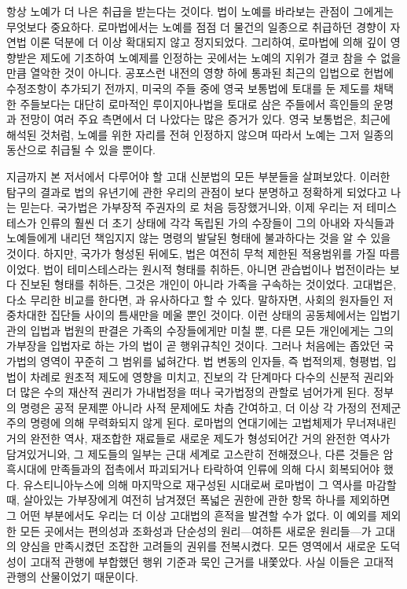 항상 노예가 더 나은 취급을 받는다는 것이다.
법이 노예를 바라보는 관점이 그에게는 무엇보다 중요하다.
로마법에서는
노예를 점점 더 물건의 일종으로 취급하던 경향이
자연법 이론 덕분에
더 이상 확대되지 않고 정지되었다.
그리하여,
로마법에 의해 깊이 영향받은 제도에 기초하여 노예제를 인정하는 곳에서는
노예의 지위가 결코 참을 수 없을 만큼 열악한 것이 아니다.
공포스런 내전의 영향 하에 통과된 최근의 입법으로
헌법에 수정조항이 추가되기 전까지,
미국의 주들 중에
영국 보통법에 토대를 둔 제도를 채택한 주들보다는
대단히 로마적인 루이지아나법을 토대로 삼은 주들에서
흑인들의 운명과 전망이 여러 주요 측면에서 더 나았다는
많은 증거가 있다.
영국 보통법은, 최근에 해석된 것처럼,
노예를 위한 자리를 전혀 인정하지 않으며
따라서 노예는 그저 일종의 동산으로 취급될 수 있을 뿐이다.

지금까지 본 저서에서 다루어야 할 고대 신분법의 모든 부분들을 살펴보았다.
이러한 탐구의 결과로
법의 유년기에 관한 우리의 관점이 보다 분명하고 정확하게 되었다고
나는 믿는다.
국가법은
가부장적 주권자의 로
처음 등장했거니와,
이제 우리는
저 테미스테스가
인류의 훨씬 더 초기 상태에
각각 독립된 가의 수장들이 그의 아내와 자식들과 노예들에게 내리던
책임지지 않는 명령의
발달된 형태에 불과하다는 것을
알 수 있을 것이다.
하지만, 국가가 형성된 뒤에도,
법은 여전히 무척 제한된 적용범위를 가질 따름이었다.
법이 테미스테스라는 원시적 형태를 취하든,
아니면 관습법이나 법전이라는 보다 진보된 형태를 취하든,
그것은 개인이 아니라 가족을 구속하는 것이었다.
고대법은,
다소 무리한 비교를 한다면, 과 유사하다고 할 수 있다.
말하자면, 사회의 원자들인 저 중차대한 집단들 사이의 틈새만을 메울 뿐인 것이다.
이런 상태의 공동체에서는
입법기관의 입법과 법원의 판결은
가족의 수장들에게만 미칠 뿐,
다른 모든 개인에게는
그의 가부장을 입법자로 하는
가의 법이 곧 행위규칙인 것이다.
그러나 처음에는 좁았던 국가법의 영역이 꾸준히 그 범위를 넓혀간다.
법 변동의 인자들, 즉
법적의제, 형평법, 입법이 차례로 원초적 제도에 영향을 미치고,
진보의 각 단계마다
다수의 신분적 권리와 더 많은 수의 재산적 권리가
가내법정을 떠나 국가법정의 관할로 넘어가게 된다.
정부의 명령은 공적 문제뿐 아니라 사적 문제에도 차츰 간여하고,
더 이상 각 가정의 전제군주의 명령에 의해 무력화되지 않게 된다.
로마법의 연대기에는
고법체제가 무너져내린 거의 완전한 역사,
재조합한 재료들로 새로운 제도가 형성되어간
거의 완전한 역사가 담겨있거니와,
그 제도들의 일부는 근대 세계로 고스란히 전해졌으나,
다른 것들은 암흑시대에 만족들과의 접촉에서 파괴되거나 타락하여
인류에 의해 다시 회복되어야 했다.
유스티니아누스에 의해 마지막으로 재구성된 시대로써
로마법이 그 역사를 마감할 때,
살아있는 가부장에게 여전히 남겨졌던 폭넓은 권한에 관한 항목 하나를 제외하면
그 어떤 부분에서도 우리는 더 이상 고대법의 흔적을 발견할 수가 없다.
이 예외를 제외한 모든 곳에서는
편의성과 조화성과 단순성의 원리---여하튼 새로운 원리들---가
고대의 양심을 만족시켰던 조잡한 고려들의 권위를 전복시켰다.
모든 영역에서
새로운 도덕성이 고대적 관행에 부합했던 행위 기준과 묵인 근거를
내쫓았다. 사실 이들은 고대적 관행의 산물이었기 때문이다.


